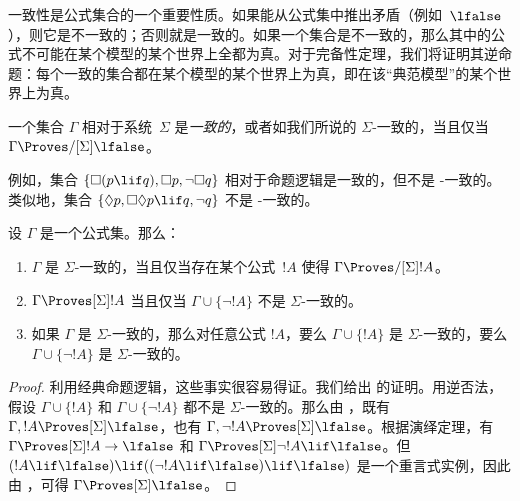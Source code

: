 \documentclass[../../../include/open-logic-section]{subfiles}
\begin{document}


一致性是公式集合的一个重要性质。如果能从公式集中推出矛盾（例如~$\lfalse$），则它是不一致的；否则就是一致的。如果一个集合是不一致的，那么其中的公式不可能在某个模型的某个世界上全都为真。对于完备性定理，我们将证明其逆命题：每个一致的集合都在某个模型的某个世界上为真，即在该“典范模型”的某个世界上为真。

\begin{defn}
  一个集合 $\Gamma$ 相对于系统~$\Sigma$ 是\emph{一致的}，或者如我们所说的 $\Sigma$-一致的，当且仅当 $\Gamma \Proves/[\Sigma] \lfalse$。
\end{defn}

例如，集合 $\{ \Box(p \lif q), \Box p, \lnot\Box q \}$ 相对于命题逻辑是一致的，但不是 -一致的。类似地，集合 $\{ \Diamond p, \Box\Diamond
p \lif q, \lnot q \}$ 不是 -一致的。

\begin{prop}
  设 $\Gamma$ 是一个公式集。那么：
  \begin{enumerate}
  \item $\Gamma$ 是 $\Sigma$-一致的，当且仅当存在某个公式~$!A$ 使得 $\Gamma \Proves/[\Sigma] !A$。
  \item {}%
    $\Gamma \Proves[\Sigma] !A$ 当且仅当 $\Gamma \cup \{ \lnot!A \}$ 不是 $\Sigma$-一致的。
  \item {}%
    如果 $\Gamma$ 是 $\Sigma$-一致的，那么对任意公式 $!A$，要么 $\Gamma \cup \{ !A \}$ 是 $\Sigma$-一致的，要么 $\Gamma \cup \{ \lnot!A \}$ 是 $\Sigma$-一致的。
  \end{enumerate}
\end{prop}

\begin{proof}
  利用经典命题逻辑，这些事实很容易得证。我们给出  的证明。用逆否法，假设 $\Gamma \cup \{ !A \}$ 和 $\Gamma \cup \{ \lnot!A \}$ 都不是 $\Sigma$-一致的。那么由 ，既有 $\Gamma, !A \Proves[\Sigma] \lfalse$，也有 $\Gamma, \lnot !A \Proves[\Sigma] \lfalse$。根据演绎定理，有 $\Gamma \Proves[\Sigma] !A \to \lfalse$ 和 $\Gamma \Proves[\Sigma] \lnot!A \lif \lfalse$。但 $(!A \lif
  \lfalse) \lif ((\lnot!A \lif \lfalse) \lif \lfalse)$ 是一个重言式实例，因此由 ，可得 $\Gamma \Proves[\Sigma] \lfalse$。
\end{proof}
\end{document}
